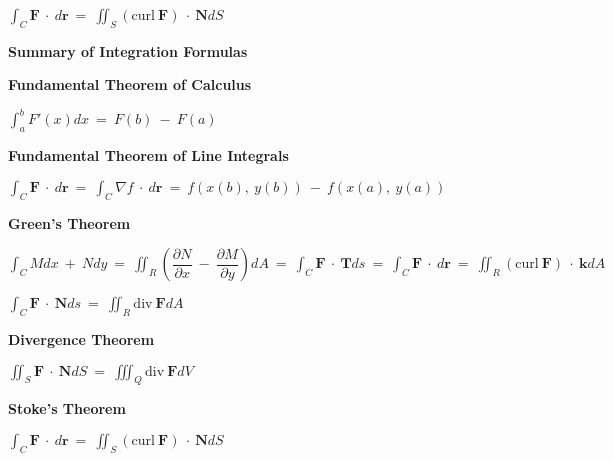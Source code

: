 \documentclass{article}
\begin{document}
\begin{large}
\hspace{2.5in} $\displaystyle\int_{C}\textbf{F}\ \cdot\ d\textbf{r}\ =\ \displaystyle\iint_{S}(\text{curl}\ \textbf{F})\ \cdot\ \textbf{N}dS$

\textbf{Summary of Integration Formulas}

\vspace{-0.2in}
\hspace{0.1in} \textbf{Fundamental Theorem of Calculus}

\hspace{1.5in} $\displaystyle\int^{b}_{a}F'(x)dx\ =\ F(b)\ -\ F(a)$

\hspace{0.1in} \textbf{Fundamental Theorem of Line Integrals}

\hspace{1.0in} $\int_{C}\textbf{F}\ \cdot\ d\textbf{r}\ =\ \displaystyle\int_{C}\nabla f\ \cdot\ d\textbf{r}\ =\ f(x(b),\ y(b))\ -\ f(x(a),\ y(a))$

\hspace{0.1in} \textbf{Green's Theorem}

\hspace{0.2in} {\large$\int_{C}Mdx\ +\ Ndy\ =\ \displaystyle\iint_{R}\left(\dfrac{\partial N}{\partial x}\ -\ \dfrac{\partial M}{\partial y}\right)dA\ =\ \displaystyle\int_{C}\textbf{F}\ \cdot\ \textbf{T}ds\ =\ \displaystyle\int_{C}\textbf{F}\ \cdot\ d\textbf{r}\ =\ \displaystyle\iint_{R}(\text{curl}\ \textbf{F})\ \cdot\ \textbf{k}dA$}

\hspace{0.2in} $\displaystyle\int_{C}\textbf{F}\ \cdot\ \textbf{N}ds\ =\ \displaystyle\iint_{R}\text{div}\ \textbf{F}dA$

\hspace{0.1in} \textbf{Divergence Theorem}

\hspace{2.5in} $\displaystyle\iint_{S}\textbf{F}\ \cdot\ \textbf{N}dS\ =\ \displaystyle\iiint_{Q}\text{div}\ \textbf{F}dV$

\hspace{0.1in} \textbf{Stoke's Theorem}

\hspace{2.5in} $\displaystyle\int_{C}\textbf{F}\ \cdot\ d\textbf{r}\ =\ \displaystyle\iint_{S}(\text{curl}\ \textbf{F})\ \cdot\ \textbf{N}dS$

\newpage

\end{large}
\end{document}
